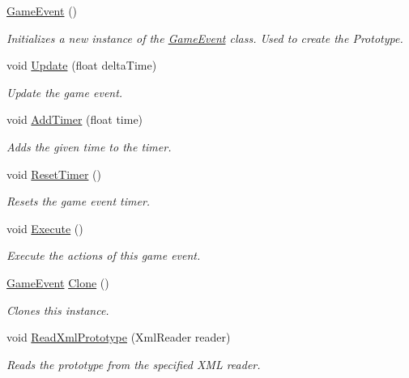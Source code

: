 \begin{DoxyCompactItemize}
\item 
\hyperlink{class_game_event_a575221b54e41817d77dfdd0bd2a8427c}{Game\+Event} ()
\begin{DoxyCompactList}\small\item\em Initializes a new instance of the \hyperlink{class_game_event}{Game\+Event} class. Used to create the Prototype. \end{DoxyCompactList}\item 
void \hyperlink{class_game_event_af2a343f2404849a8b171c5a34dc75168}{Update} (float delta\+Time)
\begin{DoxyCompactList}\small\item\em Update the game event. \end{DoxyCompactList}\item 
void \hyperlink{class_game_event_a9dfc62e4b1595e95238c7e69973f9eb7}{Add\+Timer} (float time)
\begin{DoxyCompactList}\small\item\em Adds the given time to the timer. \end{DoxyCompactList}\item 
void \hyperlink{class_game_event_adcb077cb4321b37575624d41cca71453}{Reset\+Timer} ()
\begin{DoxyCompactList}\small\item\em Resets the game event timer. \end{DoxyCompactList}\item 
void \hyperlink{class_game_event_ab310e768a6d0603e1c04db54e6ac06ad}{Execute} ()
\begin{DoxyCompactList}\small\item\em Execute the actions of this game event. \end{DoxyCompactList}\item 
\hyperlink{class_game_event}{Game\+Event} \hyperlink{class_game_event_a41d51d26400785d060c39f534f98dc75}{Clone} ()
\begin{DoxyCompactList}\small\item\em Clones this instance. \end{DoxyCompactList}\item 
void \hyperlink{class_game_event_a5219d3c4766e76549b4b90926a4e5066}{Read\+Xml\+Prototype} (Xml\+Reader reader)
\begin{DoxyCompactList}\small\item\em Reads the prototype from the specified X\+ML reader. \end{DoxyCompactList}\end{DoxyCompactItemize}

